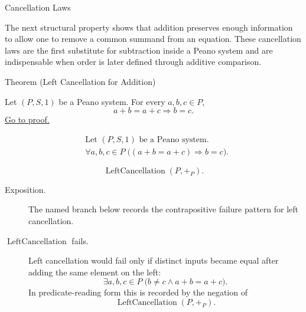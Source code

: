 \begin{topicbox}{Cancellation Laws}
\begin{exposition}
The next structural property shows that addition preserves enough information
to allow one to remove a common summand from an equation. These cancellation
laws are the first substitute for subtraction inside a Peano system and are
indispensable when order is later defined through additive comparison.
\end{exposition}

\begin{theorembox}{Theorem (Left Cancellation for Addition)}
\begin{theorem}
\label{thm:addition-left-cancellation}
Let $(P,S,1)$ be a Peano system. For every $a,b,c \in P$,
\[
a+b=a+c
\Longrightarrow
b=c.
\]
\hyperref[prf:addition-left-cancellation]{Go to proof.}
\end{theorem}
\end{theorembox}

\begin{remark*}
\[
\begin{aligned}
&\text{Let } (P,S,1) \text{ be a Peano system.}\\
&\forall a,b,c \in P\;\bigl((a+b=a+c) \Longrightarrow b=c\bigr).
\end{aligned}
\]
\end{remark*}

\begin{remark*}
\[
\operatorname{LeftCancellation}(P,+_P).
\]
\end{remark*}



\begin{remark*}
\begin{description}
  \item[Exposition.] The named branch below records the contrapositive failure
  pattern for left cancellation.
  \item[\(\operatorname{LeftCancellation}\) fails.] Left cancellation would
  fail only if distinct inputs became equal after adding the same element on the
  left:
  \[
  \exists a,b,c \in P\;\bigl(b \neq c \land a+b=a+c\bigr).
  \]
  In predicate-reading form this is recorded by the negation of
  \[
  \operatorname{LeftCancellation}(P,+_P).
  \]
\end{description}
\end{remark*}


\end{topicbox}
